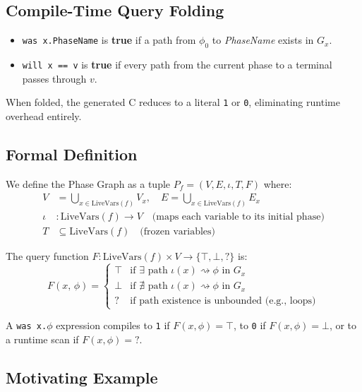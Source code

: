 \documentclass[11pt,a4paper]{article}
\begin{document}
\subsection{Compile-Time Query Folding}

\begin{itemize}[leftmargin=*,itemsep=2pt]
  \item \texttt{was x.PhaseName} is \textbf{true} if a path from $\phi_0$ to
    \textit{PhaseName} exists in $G_x$.
  \item \texttt{will x == v} is \textbf{true} if every path from the current phase to a
    terminal passes through $v$.
\end{itemize}

When folded, the generated C reduces to a literal \texttt{1} or \texttt{0}, eliminating
runtime overhead entirely.

\subsection{Formal Definition}

We define the Phase Graph as a tuple $P_f = (V, E, \iota, T, F)$ where:
\begin{align*}
  V &= \bigcup_{x \in \mathrm{LiveVars}(f)} V_x, \quad
  E = \bigcup_{x \in \mathrm{LiveVars}(f)} E_x\\
  \iota &: \mathrm{LiveVars}(f) \to V \quad\text{(maps each variable to its initial phase)}\\
  T &\subseteq \mathrm{LiveVars}(f) \quad\text{(frozen variables)}
\end{align*}

The query function $F : \mathrm{LiveVars}(f) \times V \to \{\top, \bot, \mathord{?}\}$ is:
\[
  F(x,\,\phi) = \begin{cases}
    \top  & \text{if } \exists \text{ path } \iota(x) \rightsquigarrow \phi \text{ in } G_x \\
    \bot  & \text{if } \nexists \text{ path } \iota(x) \rightsquigarrow \phi \text{ in } G_x \\
    \mathord{?} & \text{if path existence is unbounded (e.g., loops)}
  \end{cases}
\]

A \texttt{was x.$\phi$} expression compiles to \texttt{1} if $F(x,\phi) = \top$, to \texttt{0}
if $F(x,\phi) = \bot$, or to a runtime scan if $F(x,\phi) = \mathord{?}$.

\subsection{Motivating Example}
\end{document}
